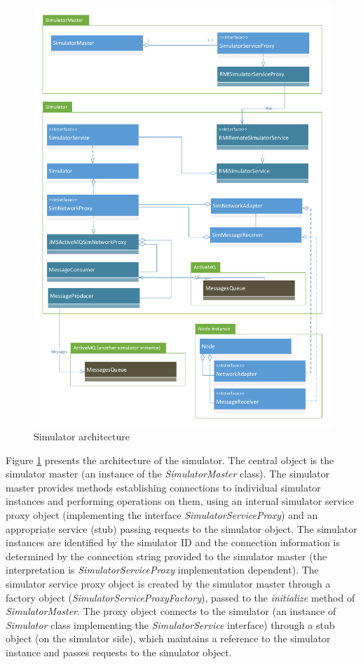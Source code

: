 \begin{figure}
\centering
\includegraphics[trim = 5mm 0mm 5mm 5mm, clip, scale=.79]{img/HyCubeSimulator.pdf}
\caption{Simulator architecture}
\label{fig:simHyCubeSimulatorArchitecture}
\end{figure}

Figure \ref{fig:simHyCubeSimulatorArchitecture} presents the architecture of the simulator. The central object is the simulator master (an instance of the \emph{SimulatorMaster} class). The simulator master provides methods establishing connections to individual simulator instances and performing operations on them, using an internal simulator service proxy object (implementing the interface \emph{SimulatorServiceProxy}) and an appropriate service (stub) passing requests to the simulator object. The simulator instances are identified by the simulator ID and the connection information is determined by the connection string provided to the simulator master (the interpretation is \emph{SimulatorServiceProxy} implementation dependent). The simulator service proxy object is created by the simulator master through a factory object (\emph{SimulatorServiceProxyFactory}), passed to the \emph{initialize} method of \emph{SimulatorMaster}. The proxy object connects to the simulator (an instance of \emph{Simulator} class implementing the \emph{SimulatorService} interface) through a stub object (on the simulator side), which maintains a reference to the simulator instance and passes requests to the simulator object.

